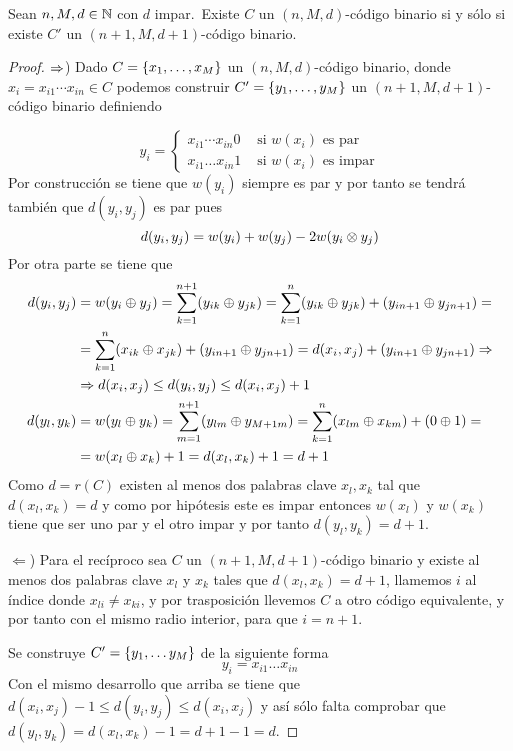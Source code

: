 \begin{lemma}
	Sean $n, M, d\in\mathbb{N}$ con $d$ impar.\ Existe $C$ un $(n, M, d)$-código binario si y sólo si existe $C'$ un $(n+1, M, d+1)$-código binario.
\end{lemma}
\begin{proof}
	$\Rightarrow$) Dado $C=\left\{x_1, \dots, x_M\right\}$ un $(n, M, d)$-código binario, donde $x_i=x_{i1}\cdots x_{in}\in C$ podemos construir $C'=\left\{y_1,\dots, y_M\right\}$ un $(n+1, M, d+1)$-código binario definiendo

	\[
		y_i=\begin{cases}
			    x_{i1}\cdots x_{in}0 & \text{ si $w(x_i)$ es par}\\
			    x_{i1}\dots x_{in}1 & \text{ si $w(x_i)$ es impar}
		\end{cases}
	\]
	Por construcción se tiene que $w(y_i)$ siempre es par y por tanto se tendrá también que $d(y_i, y_j)$ es par pues
	\[
		d(y_i, y_j) = w(y_i) + w(y_j) - 2 w(y_i\otimes y_j)
	\]
	Por otra parte se tiene que
	\begin{align*}
		d(y_i, y_j) &= w(y_i\oplus y_j)=\sum_{k=1}^{n+1} (y_{ik}\oplus y_{jk})=\sum_{k=1}^{n} (y_{ik}\oplus y_{jk})+(y_{in+1}\oplus y_{jn+1})=\\
		&= \sum_{k=1}^{n} (x_{ik}\oplus x_{jk})+(y_{in+1}\oplus y_{jn+1})=d(x_i, x_j)+(y_{in+1}\oplus y_{jn+1})\Rightarrow\\
		&\Rightarrow d(x_i, x_j)\leq d(y_i, y_j)\leq d(x_i, x_j)+1\\
		d(y_l, y_k) &= w(y_l\oplus y_k)=\sum_{m=1}^{n+1} (y_{lm}\oplus y_{M+1m})=\sum_{k=1}^{n} (x_{lm}\oplus x_{km})+(0\oplus 1)=\\
		&=w(x_l\oplus x_k)+1=d(x_l, x_k)+1 = d + 1
	\end{align*}
	Como $d=r(C)$ existen al menos dos palabras clave $x_l, x_k$ tal que $d(x_l, x_k) = d$ y como por hipótesis este es impar entonces $w(x_l)$ y $w(x_k)$ tiene que ser uno par y el otro impar y por tanto $d(y_l, y_k) = d+1$.

	$\Leftarrow$) Para el recíproco sea $C$ un $(n+1, M, d+1)$-código binario y existe al menos dos palabras clave $x_l$ y $x_k$ tales que $d(x_l, x_k) = d+1$, llamemos $i$ al índice donde $x_{li}\neq x_{ki}$, y por trasposición llevemos $C$ a otro código equivalente, y por tanto con el mismo radio interior, para que $i=n+1$.

	Se construye $C'=\left\{y_1,\dots y_M\right\}$ de la siguiente forma
	\[
		y_i = x_{i1}\dots x_{in}
	\]
	Con el mismo desarrollo que arriba se tiene que $d(x_i, x_j)-1\leq d(y_i, y_j)\leq d(x_i, x_j)$ y así sólo falta comprobar que $d(y_l, y_k) = d(x_l, x_k)-1=d+1-1=d$.
\end{proof}


